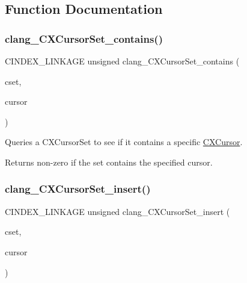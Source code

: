 \subsection{Function Documentation}
\mbox{\label{group__CINDEX__CURSOR__MANIP_ga518db5daf2ca251e4ff983d9f4f7d75d}} 
\subsubsection{\texorpdfstring{clang\+\_\+\+C\+X\+Cursor\+Set\+\_\+contains()}{clang\_CXCursorSet\_contains()}}
{\footnotesize\ttfamily C\+I\+N\+D\+E\+X\+\_\+\+L\+I\+N\+K\+A\+GE unsigned clang\+\_\+\+C\+X\+Cursor\+Set\+\_\+contains (\begin{DoxyParamCaption}\item[{\mbox{\hyperlink{group__CINDEX__CURSOR__MANIP_gacca741976831fc313f80970cbf88307d}{C\+X\+Cursor\+Set}}}]{cset,  }\item[{\mbox{\hyperlink{structCXCursor}{C\+X\+Cursor}}}]{cursor }\end{DoxyParamCaption})}



Queries a C\+X\+Cursor\+Set to see if it contains a specific \mbox{\hyperlink{structCXCursor}{C\+X\+Cursor}}. 

\begin{DoxyReturn}{Returns}
non-\/zero if the set contains the specified cursor. 
\end{DoxyReturn}
\mbox{\label{group__CINDEX__CURSOR__MANIP_ga172e5a92c77da9609ad80baf08751dd1}} 
\subsubsection{\texorpdfstring{clang\+\_\+\+C\+X\+Cursor\+Set\+\_\+insert()}{clang\_CXCursorSet\_insert()}}
{\footnotesize\ttfamily C\+I\+N\+D\+E\+X\+\_\+\+L\+I\+N\+K\+A\+GE unsigned clang\+\_\+\+C\+X\+Cursor\+Set\+\_\+insert (\begin{DoxyParamCaption}\item[{\mbox{\hyperlink{group__CINDEX__CURSOR__MANIP_gacca741976831fc313f80970cbf88307d}{C\+X\+Cursor\+Set}}}]{cset,  }\item[{\mbox{\hyperlink{structCXCursor}{C\+X\+Cursor}}}]{cursor }\end{DoxyParamCaption})}



